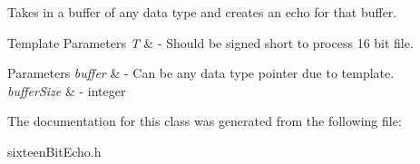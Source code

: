 Takes in a buffer of any data type and creates an echo for that buffer. 


\begin{DoxyTemplParams}{Template Parameters}
{\em T} & -\/ Should be signed short to process 16 bit file. \\
\hline
\end{DoxyTemplParams}

\begin{DoxyParams}{Parameters}
{\em buffer} & -\/ Can be any data type pointer due to template. \\
\hline
{\em buffer\+Size} & -\/ integer \\
\hline
\end{DoxyParams}


The documentation for this class was generated from the following file\+:\begin{DoxyCompactItemize}
\item 
sixteen\+Bit\+Echo.\+h\end{DoxyCompactItemize}
